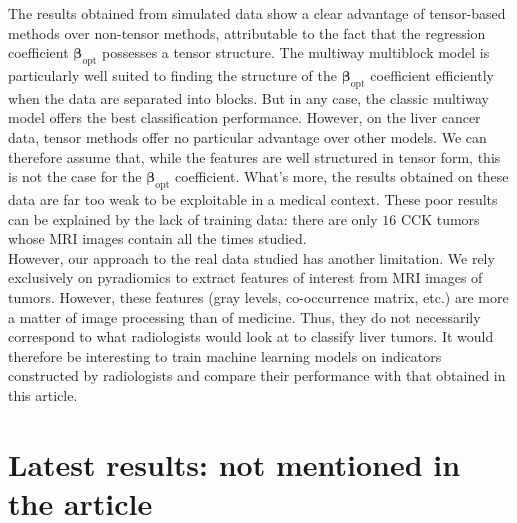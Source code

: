 \documentclass[preprint,12pt]{elsarticle}
\begin{document}
The results obtained from simulated data show a clear advantage of tensor-based methods over non-tensor methods, attributable to the fact that the regression coefficient $\bm{\beta}_{\text{opt}}$ possesses a tensor structure. The multiway multiblock model is particularly well suited to finding the structure of the $\bm{\beta}_{\text{opt}}$ coefficient efficiently when the data are separated into blocks. But in any case, the classic multiway model offers the best classification performance. However, on the liver cancer data, tensor methods offer no particular advantage over other models. We can therefore assume that, while the features are well structured in tensor form, this is not the case for the $\bm{\beta}_\text{opt}$ coefficient. What's more, the results obtained on these data are far too weak to be exploitable in a medical context. These poor results can be explained by the lack of training data: there are only $16$ CCK tumors whose MRI images contain all the times studied.\\
\indent However, our approach to the real data studied has another limitation. We rely exclusively on pyradiomics to extract features of interest from MRI images of tumors. However, these features (gray levels, co-occurrence matrix, etc.) are more a matter of image processing than of medicine. Thus, they do not necessarily correspond to what radiologists would look at to classify liver tumors. It would therefore be interesting to train machine learning models on indicators constructed by radiologists and compare their performance with that obtained in this article. 

\newpage

\section{Latest results: not mentioned in the article}
\end{document}

